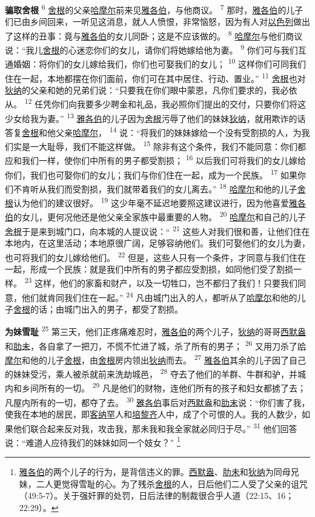 \textbf{骗取舍根 }
\textsuperscript{6}
\uline{舍根}的父亲\uline{哈摩尔}前来见\uline{雅各伯}，与他商议。
\textsuperscript{7}
那时，\uline{雅各伯}的儿子们已由乡间回来，一听见这消息，就人人愤恨，非常恼怒，因为有人对\uline{以色列}做出了这样的丑事：竟与\uline{雅各伯}的女儿同卧；这是不应该做的。
\textsuperscript{8}
\uline{哈摩尔}与他们商议说：“我儿\uline{舍根}的心迷恋你们的女儿，请你们将她嫁给他为妻。
\textsuperscript{9}
你们可与我们互通婚姻：将你们的女儿嫁给我们，你们也可娶我们的女儿；
\textsuperscript{10}
这样你们可同我们住在一起，本地都摆在你们面前，你们可在其中居住、行动、置业。”
\textsuperscript{11}
\uline{舍根}也对\uline{狄纳}的父亲和她的兄弟们说：“只要我在你们眼中蒙恩，凡你们要求的，我必依从。
\textsuperscript{12}
任凭你们向我要多少聘金和礼品，我必照你们提出的交付，只要你们将这少女给我为妻。”
\textsuperscript{13}
\uline{雅各伯}的儿子因为\uline{舍根}污辱了他们的妹妹\uline{狄纳}，就用欺诈的话答复\uline{舍根}和他父亲\uline{哈摩尔}，
\textsuperscript{14}
说：“将我们的妹妹嫁给一个没有受割损的人，为我们实是一大耻辱，我们不能这样做。
\textsuperscript{15}
除非有这个条件，我们不能同意：你们都应和我们一样，使你们中所有的男子都受割损；
\textsuperscript{16}
以后我们可将我们的女儿嫁给你们，我们也可娶你们的女儿；我们与你们住在一起，成为一个民族。
\textsuperscript{17}
如果你们不肯听从我们而受割损，我们就带着我们的女儿离去。”
\textsuperscript{18}
\uline{哈摩尔}和他的儿子\uline{舍根}认为他们的建议很好。
\textsuperscript{19}
这少年毫不延迟地要照这建议进行，因为他喜爱\uline{雅各伯}的女儿，更何况他还是他父亲全家族中最重要的人物。
\textsuperscript{20}
\uline{哈摩尔}和自己的儿子\uline{舍根}于是来到城门口，向本城的人提议说：“
\textsuperscript{21}
这些人对我们很和善，让他们住在本地内，在这里活动；本地原很广阔，足够容纳他们。我们可娶他们的女儿为妻，也可将我们的女儿嫁给他们。
\textsuperscript{22}
但是，这些人只有一个条件，才同意与我们住在一起，形成一个民族：就是我们中所有的男子都应受割损，如同他们受了割损一样。
\textsuperscript{23}
这样，他们的家畜和财产，以及一切牲口，岂不都归了我们！只要我们同意，他们就肯同我们住在一起。”
\textsuperscript{24}
凡由城门出入的人，都听从了\uline{哈摩尔}和他的儿子\uline{舍根}的话；由城门出入的男子，都受了割损。

\textbf{为妹雪耻 }
\textsuperscript{25}
第三天，他们正疼痛难忍时，\uline{雅各伯}的两个儿子，\uline{狄纳}的哥哥\uline{西默盎}和\uline{肋未}，各自拿了一把刀，不慌不忙进了城，杀了所有的男子；
\textsuperscript{26}
又用刀杀了\uline{哈摩尔}和他的儿子\uline{舍根}，由\uline{舍根}房内领出\uline{狄纳}而去。
\textsuperscript{27}
\uline{雅各伯}其余的儿子因了自己的妹妹受污，乘人被杀就前来洗劫城邑，
\textsuperscript{28}
夺去了他们的羊群、牛群和驴，并城内和乡间所有的一切。
\textsuperscript{29}
凡是他们的财物，连他们所有的孩子和妇女都掳了去；凡屋内所有的一切，都夺了去。
\textsuperscript{30}
\uline{雅各伯}事后对\uline{西默盎}和\uline{肋末}说：“你们害了我，使我在本地的居民，即\uline{客纳罕}人和\uline{培黎齐}人中，成了个可恨的人。我的人数少，如果他们联合起来反对我，攻击我，那未我和我全家就必同归于尽。”
\textsuperscript{31}
他们回答说：“难道人应待我们的妹妹如同一个妓女？”
\footnote{\uline{雅各伯}的两个儿子的行为，是背信违义的罪。\uline{西默盎}、\uline{肋未}和\uline{狄纳}为同母兄妹，二人更觉得雪耻的心。为了残杀\uline{舍根}的人，日后他们二人受了父亲的诅咒（49:5-7）。关于强奸罪的处罚，日后法律的制裁很合乎人道（22:15、16；22:29）。}

